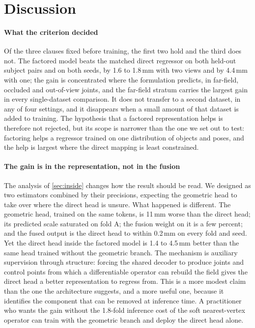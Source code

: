 \section{Discussion}
\label{sec:discussion}

\paragraph{What the criterion decided}
Of the three clauses fixed before training, the first two hold and the third does not. The factored model beats the matched direct regressor on both held-out subject pairs and on both seeds, by 1.6 to 1.8\,mm with two views and by 4.4\,mm with one; the gain is concentrated where the formulation predicts, in far-field, occluded and out-of-view joints, and the far-field stratum carries the largest gain in every single-dataset comparison. It does not transfer to a second dataset, in any of four settings, and it disappears when a small amount of that dataset is added to training. The hypothesis that a factored representation helps is therefore not rejected, but its scope is narrower than the one we set out to test: factoring helps a regressor trained on one distribution of objects and poses, and the help is largest where the direct mapping is least constrained.

\paragraph{The gain is in the representation, not in the fusion}
The analysis of \cref{sec:inside} changes how the result should be read. We designed \method{} as two estimators combined by their precisions, expecting the geometric head to take over where the direct head is unsure. What happened is different. The geometric head, trained on the same tokens, is 11\,mm worse than the direct head; its predicted scale saturated on fold A; the fusion weight on it is a few percent; and the fused output is the direct head to within 0.2\,mm on every fold and seed. Yet the direct head inside the factored model is 1.4 to 4.5\,mm better than the same head trained without the geometric branch. The mechanism is auxiliary supervision through structure: forcing the shared decoder to produce joints and control points from which a differentiable operator can rebuild the field gives the direct head a better representation to regress from. This is a more modest claim than the one the architecture suggests, and a more useful one, because it identifies the component that can be removed at inference time. A practitioner who wants the gain without the 1.8-fold inference cost of the soft nearest-vertex operator can train with the geometric branch and deploy the direct head alone.

